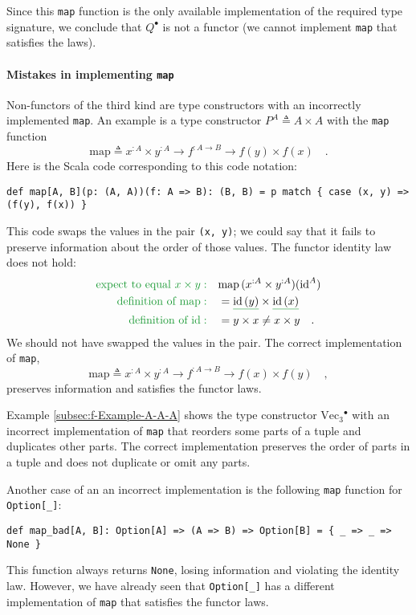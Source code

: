 Since this \lstinline!map! function is the only available implementation
of the required type signature, we conclude that $Q^{\bullet}$ is
not a functor (we cannot implement \lstinline!map! that satisfies
the laws).

\paragraph{Mistakes in implementing \texttt{map}}

Non-functors of the third kind are type constructors with an incorrectly
implemented \lstinline!map!. An example is a type constructor $P^{A}\triangleq A\times A$
with the \lstinline!map! function
\[
\text{map}\triangleq x^{:A}\times y^{:A}\rightarrow f^{:A\rightarrow B}\rightarrow f(y)\times f(x)\quad.
\]
Here is the Scala code corresponding to this code notation:
\begin{lstlisting}
def map[A, B](p: (A, A))(f: A => B): (B, B) = p match { case (x, y) => (f(y), f(x)) }
\end{lstlisting}
This code swaps the values in the pair \lstinline!(x, y)!; we could
say that it fails to preserve information about the order of those
values. The functor identity law does not hold:
\begin{align*}
{\color{greenunder}\text{expect to equal }x\times y:}\quad & \text{map}\,(x^{:A}\times y^{:A})(\text{id}^{A})\\
{\color{greenunder}\text{definition of }\text{map}:}\quad & =\gunderline{\text{id}\,(y)}\times\gunderline{\text{id}\,(x)}\\
{\color{greenunder}\text{definition of }\text{id}:}\quad & =y\times x\neq x\times y\quad.
\end{align*}
We should not have swapped the values in the pair. The correct implementation
of \lstinline!map!,
\[
\text{map}\triangleq x^{:A}\times y^{:A}\rightarrow f^{:A\rightarrow B}\rightarrow f(x)\times f(y)\quad,
\]
preserves information and satisfies the functor laws.

Example \ref{subsec:f-Example-A-A-A} shows the type constructor $\text{Vec}_{3}{}^{\bullet}$
with an incorrect implementation of \lstinline!map! that reorders
some parts of a tuple and duplicates other parts. The correct implementation
preserves the order of parts in a tuple and does not duplicate or
omit any parts.

Another case of an an incorrect implementation is the following \lstinline!map!
function for \lstinline!Option[_]!:
\begin{lstlisting}
def map_bad[A, B]: Option[A] => (A => B) => Option[B] = { _ => _ => None }
\end{lstlisting}
This function always returns \lstinline!None!, losing information
and violating the identity law. However, we have already seen that
\lstinline!Option[_]! has a different implementation of \lstinline!map!
that satisfies the functor laws.

